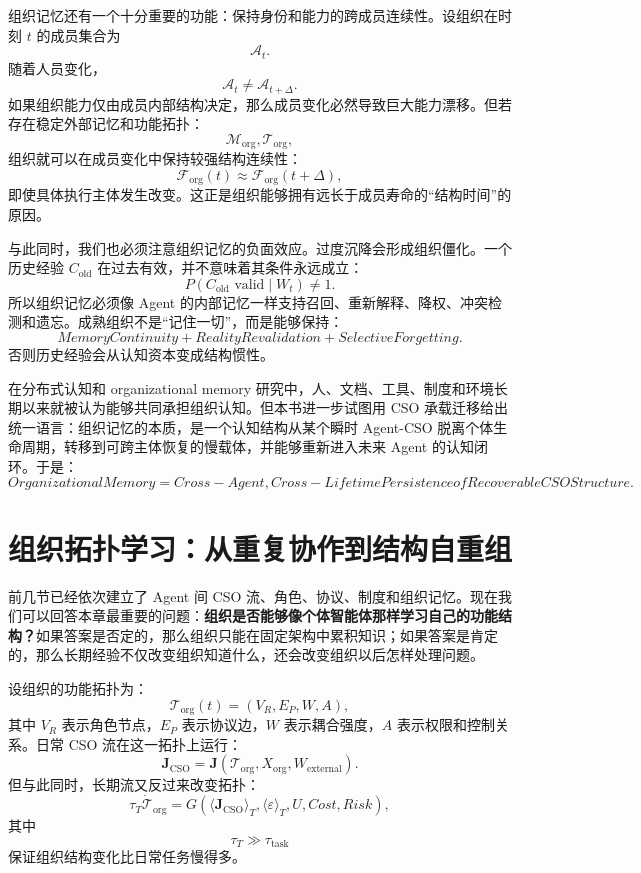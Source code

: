 组织记忆还有一个十分重要的功能：保持身份和能力的跨成员连续性。设组织在时刻 $t$ 的成员集合为
\[
\mathcal A_t.
\]
随着人员变化，
\[
\mathcal A_t\neq\mathcal A_{t+\Delta}.
\]
如果组织能力仅由成员内部结构决定，那么成员变化必然导致巨大能力漂移。但若存在稳定外部记忆和功能拓扑：
\[
\mathcal M_{\mathrm{org}},
\mathcal T_{\mathrm{org}},
\]
组织就可以在成员变化中保持较强结构连续性：
\[
\mathcal F_{\mathrm{org}}(t)
\approx
\mathcal F_{\mathrm{org}}(t+\Delta),
\]
即使具体执行主体发生改变。这正是组织能够拥有远长于成员寿命的“结构时间”的原因。

与此同时，我们也必须注意组织记忆的负面效应。过度沉降会形成组织僵化。一个历史经验 $C_{\mathrm{old}}$ 在过去有效，并不意味着其条件永远成立：
\[
P(C_{\mathrm{old}}\text{ valid}\mid W_t)
\neq
1.
\]
所以组织记忆必须像 Agent 的内部记忆一样支持召回、重新解释、降权、冲突检测和遗忘。成熟组织不是“记住一切”，而是能够保持：
\[
\boxed{
MemoryContinuity
+
RealityRevalidation
+
SelectiveForgetting.
}
\]
否则历史经验会从认知资本变成结构惯性。

在分布式认知和 organizational memory 研究中，人、文档、工具、制度和环境长期以来就被认为能够共同承担组织认知。但本书进一步试图用 CSO 承载迁移给出统一语言：组织记忆的本质，是一个认知结构从某个瞬时 Agent-CSO 脱离个体生命周期，转移到可跨主体恢复的慢载体，并能够重新进入未来 Agent 的认知闭环。于是：
\[
\boxed{
OrganizationalMemory
=
Cross-Agent, Cross-Lifetime Persistence of Recoverable CSO Structure.
}
\]


\section{组织拓扑学习：从重复协作到结构自重组}
\label{sec:organizational-topology-learning}

前几节已经依次建立了 Agent 间 CSO 流、角色、协议、制度和组织记忆。现在我们可以回答本章最重要的问题：\textbf{组织是否能够像个体智能体那样学习自己的功能结构？}如果答案是否定的，那么组织只能在固定架构中累积知识；如果答案是肯定的，那么长期经验不仅改变组织知道什么，还会改变组织以后怎样处理问题。

设组织的功能拓扑为：
\[
\mathcal T_{\mathrm{org}}(t)
=
(V_R,E_P,W,A),
\]
其中 $V_R$ 表示角色节点，$E_P$ 表示协议边，$W$ 表示耦合强度，$A$ 表示权限和控制关系。日常 CSO 流在这一拓扑上运行：
\[
\mathbf J_{\mathrm{CSO}}
=
\mathbf J(
\mathcal T_{\mathrm{org}},
X_{\mathrm{org}},
W_{\mathrm{external}}
).
\]
但与此同时，长期流又反过来改变拓扑：
\[
\tau_T
\dot{\mathcal T}_{\mathrm{org}}
=
G(
\langle\mathbf J_{\mathrm{CSO}}\rangle_T,
\langle\varepsilon\rangle_T,
U,
Cost,
Risk
),
\]
其中
\[
\tau_T
\gg
\tau_{\mathrm{task}}
\]
保证组织结构变化比日常任务慢得多。

